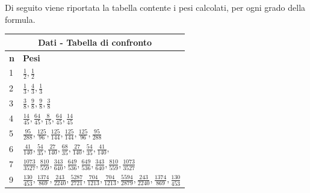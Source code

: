 \documentclass[10pt,a4paper]{article}
\begin{document}
Di seguito viene riportata la tabella contente i pesi calcolati, per ogni grado della formula.
\\
\begin{center}
  \begin{spacing}{1.5}
  \begin{longtable}{ |p{0.2cm}|p{8cm}| }
    \hline
    \multicolumn{2}{|c|}{ \textbf{Dati - Tabella di confronto}} \\
    \hline
    \textbf{n}     & \textbf{Pesi} \\
    \hline
    1 & $ \frac{1}{2}, \frac{1}{2} $ \\
    2 & $ \frac{1}{3}, \frac{4}{3}, \frac{1}{3} $ \\
    3 & $ \frac{3}{8}, \frac{9}{8}, \frac{9}{8}, \frac{3}{8} $ \\
    4 & $ \frac{14}{45}, \frac{64}{45}, \frac{8}{15}, \frac{64}{45}, \frac{14}{45} $ \\
    5 & $ \frac{95}{288}, \frac{125}{96}, \frac{125}{144}, \frac{125}{144}, \frac{125}{96}, \frac{95}{288} $ \\
    6 & $ \frac{41}{140}, \frac{54}{35}, \frac{27}{140}, \frac{68}{35}, \frac{27}{140}, \frac{54}{35}, \frac{41}{140}, $ \\
    7 & $ \frac{1073}{3527}, \frac{810}{559}, \frac{343}{640}, \frac{649}{536}, \frac{649}{536}, \frac{343}{640}, \frac{810}{559}, \frac{1073}{3527} $ \\
    9 & $ \frac{130}{453}, \frac{1374}{869}, \frac{243}{2240}, \frac{5287}{2721}, \frac{704}{1213}, \frac{704}{1213}, \frac{5594}{2879}, \frac{243}{2240}, \frac{1374}{869}, \frac{130}{453} $ \\
    \hline
  \end{longtable}
\end{spacing}
\end{center}
\end{document}

